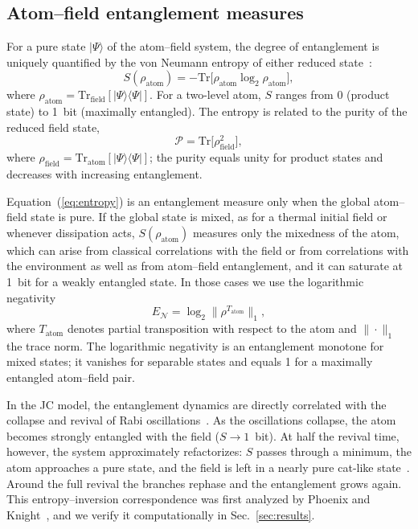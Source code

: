 \documentclass[%
 reprint,
 amsmath,amssymb,
 aps,
 floatfix,
]{revtex4-2}
\begin{document}
\subsection{Atom--field entanglement measures}
\label{sec:entropy_theory}

For a pure state $|\Psi\rangle$ of the atom--field system, the degree of entanglement is uniquely quantified by the von Neumann entropy of either reduced state~\cite{nielsen2000}:
\begin{equation}
S(\rho_{\text{atom}}) = -\mathrm{Tr}\big[\rho_{\text{atom}} \log_2 \rho_{\text{atom}}\big],
\label{eq:entropy}
\end{equation}
where $\rho_{\text{atom}} = \mathrm{Tr}_{\text{field}}[|\Psi\rangle\langle\Psi|]$. For a two-level atom, $S$ ranges from 0 (product state) to 1~bit (maximally entangled). The entropy is related to the purity of the reduced field state,
\begin{equation}
\mathcal{P} = \mathrm{Tr}\big[\rho_{\text{field}}^2\big],
\label{eq:purity}
\end{equation}
where $\rho_{\text{field}} = \mathrm{Tr}_{\text{atom}}[|\Psi\rangle\langle\Psi|]$; the purity equals unity for product states and decreases with increasing entanglement.

Equation~(\ref{eq:entropy}) is an entanglement measure only when the global atom--field state is pure. If the global state is mixed, as for a thermal initial field or whenever dissipation acts, $S(\rho_{\text{atom}})$ measures only the mixedness of the atom, which can arise from classical correlations with the field or from correlations with the environment as well as from atom--field entanglement, and it can saturate at 1~bit for a weakly entangled state. In those cases we use the logarithmic negativity~\cite{vidal2002, plenio2005}
\begin{equation}
E_{\mathcal{N}} = \log_2 \big\| \rho^{T_{\text{atom}}} \big\|_1,
\label{eq:logneg}
\end{equation}
where $T_{\text{atom}}$ denotes partial transposition with respect to the atom and $\|\cdot\|_1$ the trace norm. The logarithmic negativity is an entanglement monotone for mixed states; it vanishes for separable states and equals 1 for a maximally entangled atom--field pair.

In the JC model, the entanglement dynamics are directly correlated with the collapse and revival of Rabi oscillations~\cite{phoenix1988}. As the oscillations collapse, the atom becomes strongly entangled with the field ($S \to 1$~bit). At half the revival time, however, the system approximately refactorizes: $S$ passes through a minimum, the atom approaches a pure state, and the field is left in a nearly pure cat-like state~\cite{gea-banacloche1990, phoenix1991}. Around the full revival the branches rephase and the entanglement grows again. This entropy--inversion correspondence was first analyzed by Phoenix and Knight~\cite{phoenix1988, phoenix1991}, and we verify it computationally in Sec.~\ref{sec:results}.
\end{document}
